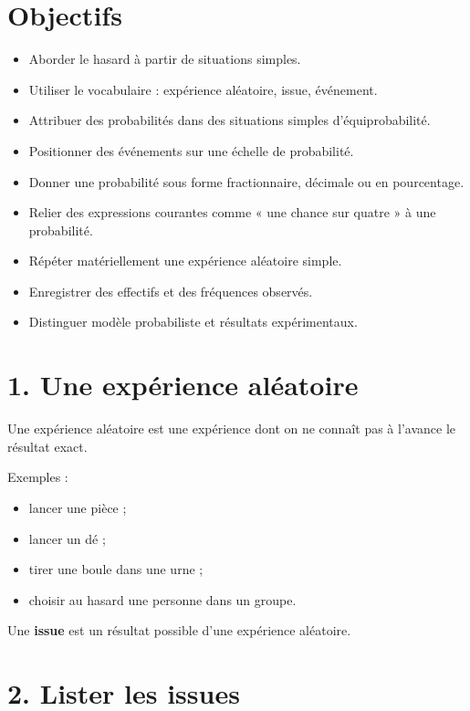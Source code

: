
\section{Objectifs}

\begin{itemize}
\item Aborder le hasard à partir de situations simples.
\item Utiliser le vocabulaire : expérience aléatoire, issue, événement.
\item Attribuer des probabilités dans des situations simples d'équiprobabilité.
\item Positionner des événements sur une échelle de probabilité.
\item Donner une probabilité sous forme fractionnaire, décimale ou en pourcentage.
\item Relier des expressions courantes comme « une chance sur quatre » à une probabilité.
\item Répéter matériellement une expérience aléatoire simple.
\item Enregistrer des effectifs et des fréquences observés.
\item Distinguer modèle probabiliste et résultats expérimentaux.
\end{itemize}

\section{1. Une expérience aléatoire}

Une expérience aléatoire est une expérience dont on ne connaît pas à l'avance le résultat exact.

Exemples :
\begin{itemize}
\item lancer une pièce ;
\item lancer un dé ;
\item tirer une boule dans une urne ;
\item choisir au hasard une personne dans un groupe.
\end{itemize}

\begin{definition}
Une \textbf{issue} est un résultat possible d'une expérience aléatoire.
\end{definition}

\section{2. Lister les issues}

